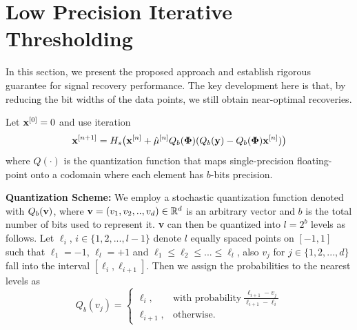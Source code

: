 \documentclass{article}
\begin{document}
\section{Low Precision Iterative Thresholding}
In this section, we present the proposed approach and establish rigorous guarantee for signal recovery performance. The key development here is that, by reducing the bit widths of the data points, we still obtain near-optimal recoveries. 

Let ${\bf x}^{[0]} = 0$ and use iteration
\begin{equation} \label{modified_update_rule}
  {\bf x}^{[n+1]} = H_s\big({\bf x}^{[n]}+\hat{\mu}^{[n]} Q_b(\boldsymbol{\Phi})(Q_b({\bf y})-Q_b(\boldsymbol{\Phi}){\bf x}^{[n]})\big)  
\end{equation}
where $Q(\cdot)$ is the quantization function that maps single-precision floating-point onto a codomain where each element has $b$-bits precision.

{\bf Quantization Scheme:} We employ a stochastic quantization function denoted with $Q_b({\bf v})$, where ${\bf v}=(v_1, v_2, .., v_d) \in \mathbb{R}^d$ is an arbitrary vector and $b$ is the total number of bits used to represent it. {\bf v} can then be quantized into $l=2^b$ levels as follows. Let $\ell_i$, $i\in \{1, 2, ..., l-1 \}$ denote $l$ equally spaced points on $[-1, 1]$ such that $\ell_1= -1$, $\ell_l= +1$ and $\ell_1\leq\ell_2 \leq ... \leq \ell_l$, also $v_j$ for $j\in \{1, 2, ..., d \}$ fall into the interval $[\ell_i, \ell_{i+1}]$. Then we assign the probabilities to the nearest levels as
\[
    Q_b(v_j) = \left\{\begin{array}{lr}
        \ell_i, & \textrm{with probability} \ \frac{\ell_{i+1}-v_j}{\ell_{i+1}-\ell_i}\\
        \ell_{i+1},&\textrm{otherwise}.  \ \ \ \  \ \ \ \ \ \ \ \ \ \ \ \ \ \ 
        \end{array}
\]
  
\end{document}
